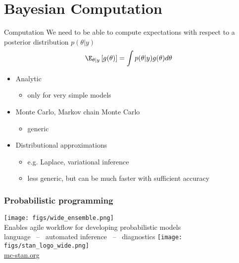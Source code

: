 \documentclass[10pt]{beamer}
\begin{document}
\section{Bayesian Computation}
\frame{\sectionpage}

\begin{frame}{Computation}
  We need to be able to compute expectations with respect to a posterior
  distribution $p(\theta|y)$
  \begin{align*}
    \E_{\theta|y}\left[ g(\theta) \right] = \int p(\theta|y)g(\theta) d\theta
  \end{align*}

  \begin{itemize}
  \item Analytic
    \begin{itemize}
    \item only for very simple models
    \end{itemize}
  \item Monte Carlo, Markov chain Monte Carlo
    \begin{itemize}
    \item generic
    \end{itemize}
  \item Distributional approximations
    \begin{itemize}
    \item e.g. Laplace, variational inference
    \item less generic, but can be much faster with sufficient accuracy
    \end{itemize}
  \end{itemize}
\end{frame}

\begin{frame}

  \frametitle{Probabilistic programming}

  \begin{center}
   \vspace{-\baselineskip}
    \texttt{[image: figs/wide\_ensemble.png]}\\
   \vspace{2\baselineskip}
  {\large Enables agile workflow for developing probabilistic models}\\
   \vspace{\baselineskip}
   language \, -- \,
   automated inference \, -- \,
   diagnostics
   \vspace{\baselineskip}
  \vfill
    \texttt{[image: figs/stan\_logo\_wide.png]}\\
    \url{mc-stan.org}
  \end{center}

\end{frame}
\end{document}
